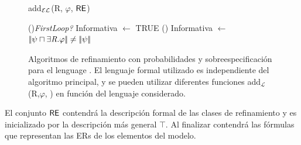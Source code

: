 \begin{figure}[!t]
\begin{algorithm}[H]
\dontprintsemicolon
\caption{add$_\mathcal{EL}$(R, $\varphi$, $\RE$)} \label{algo:bisim-add-el-over}
\Output{\footnotesize $\RE$}

\If(){\em FirstLoop?}{
    Informativa $\leftarrow$ TRUE }
\lElse() {Informativa $\leftarrow$ $|\!|\psi \sqcap \exists \mbox{\em R}.\varphi|\!| \neq |\!|\psi|\!|$} 
\end{algorithm}
\vspace*{-.5cm}\caption{Algoritmos de refinamiento con probabilidades y sobreespecificaci\'on para el lenguage \el. El lenguaje formal utilizado es independiente del algoritmo principal, y se pueden utilizar diferentes funciones add$_{\mathcal {L}}$(R,$\varphi $, \RE) en funci\'on del lenguaje considerado.}\label{fig:algo3}

\end{figure}

El conjunto $\RE$ contendr\'a la descripci\'on formal de las clases de refinamiento
y es inicializado por la descripci\'on m\'as general $\top$. Al finalizar contendr\'a las f\'ormulas que representan las ERs de los elementos del modelo.

